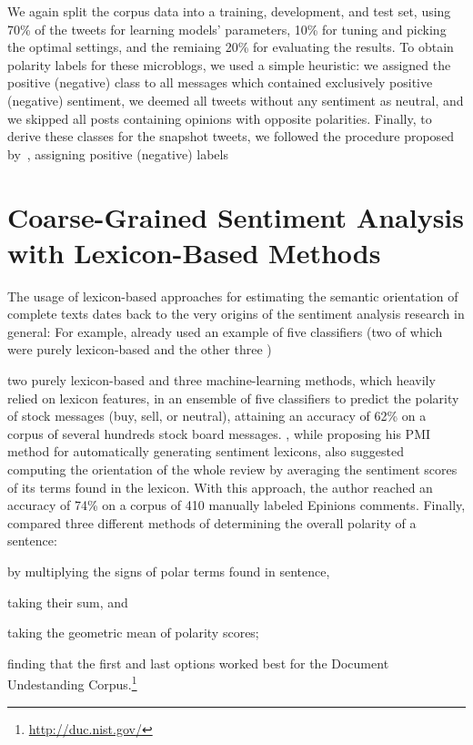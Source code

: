 We again split the corpus data into a training, development, and test
set, using 70\% of the tweets for learning models' parameters, 10\%
for tuning and picking the optimal settings, and the remiaing 20\% for
evaluating the results.  To obtain polarity labels for these
microblogs, we used a simple heuristic: we assigned the positive
(negative) class to all messages which contained exclusively positive
(negative) sentiment, we deemed all tweets without any sentiment as
neutral, and we skipped all posts containing opinions with opposite
polarities.  Finally, to derive these classes for the snapshot tweets,
we followed the procedure proposed by~\citet{Read:05}, assigning
positive (negative) labels


\section{Coarse-Grained Sentiment Analysis with Lexicon-Based
  Methods}\label{sec:cgsa:lexicon-based}

The usage of lexicon-based approaches for estimating the semantic
orientation of complete texts dates back to the very origins of the
sentiment analysis research in general: For example, \citet{Das:01}
already used an example of five classifiers (two of which were purely
lexicon-based and the other three )

two purely lexicon-based and three machine-learning
methods, which heavily relied on lexicon features, in an ensemble of
five classifiers to predict the polarity of stock messages (buy, sell,
or neutral), attaining an accuracy of 62\% on a corpus of several
hundreds stock board messages.  \citet{Turney:02}, while proposing his
PMI method for automatically generating sentiment lexicons, also
suggested computing the orientation of the whole review by averaging
the sentiment scores of its terms found in the lexicon.  With this
approach, the author reached an accuracy of 74\% on a corpus of 410
manually labeled Epinions comments.  Finally, \citet{Kim:04} compared
three different methods of determining the overall polarity of a
sentence:
\begin{inparaenum}[(i)]
  \item by multiplying the signs of polar terms found in sentence,
  \item taking their sum, and
  \item taking the geometric mean of polarity scores;
\end{inparaenum}
finding that the first and last options worked best for the Document
Undestanding Corpus.\footnote{\url{http://duc.nist.gov/}}

